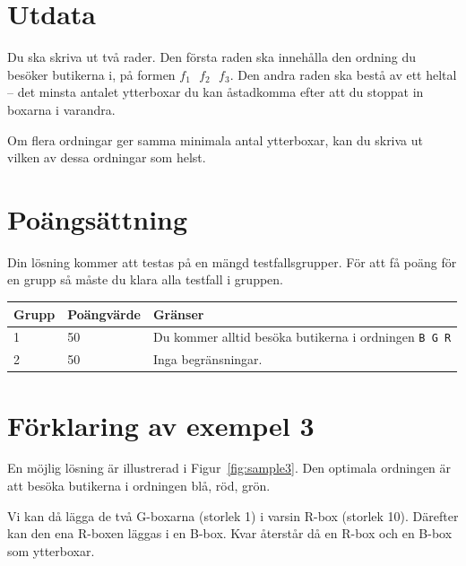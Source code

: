 \section*{Utdata}
Du ska skriva ut två rader.
Den första raden ska innehålla den ordning du besöker butikerna i, på formen $f_1\text{ }f_2\text{ }f_3$.
Den andra raden ska bestå av ett heltal -- det minsta antalet ytterboxar du kan åstadkomma efter att du stoppat in boxarna i varandra.

Om flera ordningar ger samma minimala antal ytterboxar, kan du skriva ut vilken av dessa ordningar som helst.

\section*{Poängsättning}
Din lösning kommer att testas på en mängd testfallsgrupper. För att få poäng för en grupp
så måste du klara alla testfall i gruppen.

\noindent
\begin{tabular}{| l | l | l |}
\hline
Grupp & Poängvärde & Gränser \\ \hline
1     & 50         & Du kommer alltid besöka butikerna i ordningen \texttt{B G R} \\ \hline
2     & 50         & Inga begränsningar. \\ \hline
\end{tabular}

\section*{Förklaring av exempel 3}
En möjlig lösning är illustrerad i Figur~\ref{fig:sample3}.
Den optimala ordningen är att besöka butikerna i ordningen blå, röd, grön.

Vi kan då lägga de två G-boxarna (storlek 1) i varsin R-box (storlek 10).
Därefter kan den ena R-boxen läggas i en B-box.
Kvar återstår då en R-box och en B-box som ytterboxar.
